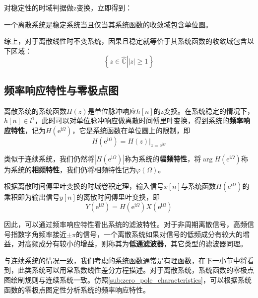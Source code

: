 \documentclass{ctexbook}
\begin{document}
对稳定性的时域判据做z变换，立即得到：

\begin{proposition}[稳定性的z域判则]
    一个离散系统是稳定系统当且仅当其系统函数的收敛域包含单位圆。
\end{proposition}

综上，对于离散线性时不变系统，因果且稳定就等价于其系统函数的收敛域包含以下区域：
\[\left\{\left.z\in\hat{\mathbb{C}}\right||z|\geq 1\right\}\]

\subsection{频率响应特性与零极点图}\label{sub:discrete_system_freq_response}

离散系统的系统函数$H(z)$是单位脉冲响应$h[n]$的z变换。在系统稳定的情况下，$h[n]\in l^1$，此时可以对单位脉冲响应做离散时间傅里叶变换，得到系统的\textbf{频率响应特性}，记为$H(\mathrm{e}^{\mathrm{i}\Omega})$，它是系统函数在单位圆上的限制，即
$$H(\mathrm{e}^{\mathrm{i}\Omega})=H(z)|_{z=\mathrm{e}^{\mathrm{i}\Omega}}$$

类似于连续系统，我们仍然将$|H(\mathrm{e}^{\mathrm{i}\Omega})|$称为系统的\textbf{幅频特性}，将$\arg H(\mathrm{e}^{\mathrm{i}\Omega})$称为系统的\textbf{相频特性}，我们仍将相频特性记为$\varphi(\Omega)$。

根据离散时间傅里叶变换的时域卷积定理，输入信号$x[n]$与系统函数$H(\mathrm{e}^{\mathrm{i}\Omega})$的乘积即为输出信号$y[n]$的离散时间傅里叶变换，即
\[Y(\mathrm{e}^{\mathrm{i}\Omega})=H(\mathrm{e}^{\mathrm{i}\Omega})X(\mathrm{e}^{\mathrm{i}\Omega})\]

因此，可以通过频率响应特性看出系统的滤波特性。对于非周期离散信号，高频信号指数字角频率接近$\pm\pi$的信号，一个离散系统如果对信号的低频成分有较大的增益，对高频成分有较小的增益，则称其为\textbf{低通滤波器}，其它类型的滤波器同理。

与连续系统的情况一致，我们考虑的系统函数通常是有理函数，在下一小节中将看到，此类系统可以用常系数线性差分方程描述。对于离散系统，系统函数的零极点图绘制规则与连续系统一致。仿照\ref{sub:zero_pole_characteristics}，可以根据系统函数的零极点图定性分析系统的频率响应特性。
\end{document}
